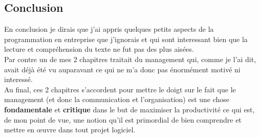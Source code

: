 \documentclass[runningheads]{llncs}
\begin{document}
\subsection{Conclusion}

En conclusion je dirais que j'ai appris quelques petits aspects de la programmation en entreprise que j'ignorais et qui sont 
interessant bien que la lecture et compréhension du texte ne fut pas des plus aisées.\\
Par contre un de mes 2 chapitres traitait du management qui, comme je l'ai dit, avait déjà été vu auparavant ce qui ne m'a donc 
pas énormément motivé ni interessé. \\ 
Au final, ces 2 chapitres s'accordent pour mettre le doigt sur le fait que le management (et donc la communication et 
l'organisation) est une chose \textbf{fondamentale} et \textbf{critique} dans le but de maximiser la productivité ce qui est, de
mon point de vue, une notion qu'il est primordial de bien comprendre et mettre en œuvre dans tout projet logiciel.

\newpage



\end{document}
